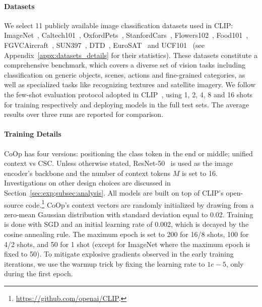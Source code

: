 \paragraph{Datasets}
We select 11 publicly available image classification datasets used in CLIP: ImageNet~\citep{deng2009imagenet}, Caltech101~\citep{fei2004learning}, OxfordPets~\citep{parkhi2012cats}, StanfordCars~\citep{krause20133d}, Flowers102~\citep{nilsback2008automated}, Food101~\citep{bossard2014food}, FGVCAircraft~\citep{maji2013fine}, SUN397~\citep{xiao2010sun}, DTD~\citep{cimpoi2014describing}, EuroSAT~\citep{helber2019eurosat} and UCF101~\citep{soomro2012ucf101} (see Appendix~\ref{appx:datasets_details} for their statistics). These datasets constitute a comprehensive benchmark, which covers a diverse set of vision tasks including classification on generic objects, scenes, actions and fine-grained categories, as well as specialized tasks like recognizing textures and satellite imagery. We follow the few-shot evaluation protocol adopted in CLIP~\citep{radford2021learning}, using 1, 2, 4, 8 and 16 shots for training respectively and deploying models in the full test sets. The average results over three runs are reported for comparison.

\paragraph{Training Details}
CoOp has four versions: positioning the class token in the end or middle; unified context vs CSC. Unless otherwise stated, ResNet-50~\citep{he2016deep} is used as the image encoder's backbone and the number of context tokens $M$ is set to 16. Investigations on other design choices are discussed in Section~\ref{sec:exp;subsec:analysis}. All models are built on top of CLIP's open-source code.\footnote{\url{https://github.com/openai/CLIP}.} CoOp's context vectors are randomly initialized by drawing from a zero-mean Gaussian distribution with standard deviation equal to 0.02. Training is done with SGD and an initial learning rate of 0.002, which is decayed by the cosine annealing rule. The maximum epoch is set to 200 for 16/8 shots, 100 for 4/2 shots, and 50 for 1 shot (except for ImageNet where the maximum epoch is fixed to 50). To mitigate explosive gradients observed in the early training iterations, we use the warmup trick by fixing the learning rate to $1e\!-\!5$, only during the first epoch.


